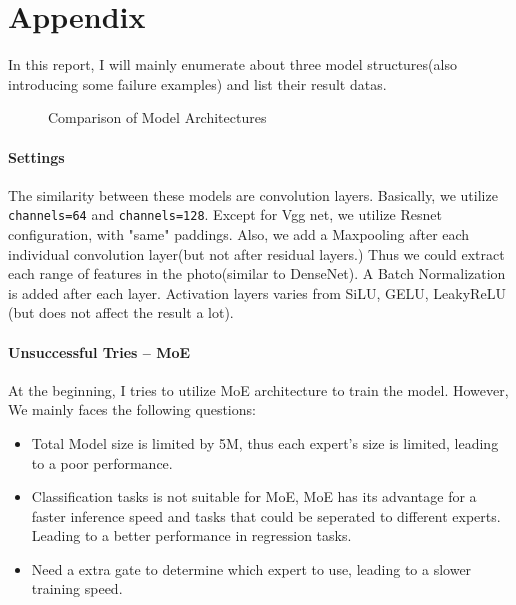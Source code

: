 \documentclass[a4 paper,12pt]{article}
\theoremstyle{definitionstyle}
\begin{document}
\section*{Appendix}
In this report, I will mainly enumerate about three model structures(also introducing some failure examples) and list their result datas.
\begin{figure}[H]
    \centering
    \caption{Comparison of Model Architectures}
    \label{fig:model_comparison}
\end{figure}
\paragraph{Settings}
The similarity between these models are convolution layers. Basically, we utilize \texttt{channels=64} and \texttt{channels=128}. Except for Vgg net, we utilize Resnet configuration, with "same" paddings. Also, we add a Maxpooling after each individual convolution layer(but not after residual layers.) Thus we could extract each range of features in the photo(similar to DenseNet). A Batch Normalization is added after each layer. Activation layers varies from SiLU, GELU, LeakyReLU (but does not affect the result a lot).
\paragraph{Unsuccessful Tries -- MoE} At the beginning, I tries to utilize MoE architecture to train the model. However, We mainly faces the following questions:
\begin{itemize}
    \item Total Model size is limited by 5M, thus each expert's size is limited, leading to a poor performance.
    \item Classification tasks is not suitable for MoE, MoE has its advantage for a faster inference speed and tasks that could be seperated to different experts. Leading to a better performance in regression tasks.
    \item Need a extra gate to determine which expert to use, leading to a slower training speed.
\end{itemize}
\end{document}
